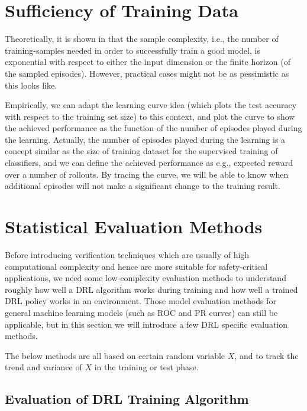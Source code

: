 \section{Sufficiency of Training Data}\label{sec:drlsufficiencytraining}

Theoretically, it is shown in \cite{DBLP:conf/alt/WeiszAS21} that the sample complexity, i.e., the number of  training-samples needed in order to successfully train a good model, is exponential with respect to either the input dimension or the finite horizon (of the sampled episodes). However, practical cases might not be as pessimistic as this looks like. 


Empirically, we can adapt the learning curve idea (which plots the test accuracy with respect to the training set size) to this context, and plot the curve to show the achieved performance as the function of the number of episodes played during the learning. Actually, the number of episodes played during the learning is a concept similar as the size of training dataset for the supervised training of classifiers, and we can define the achieved performance as e.g., expected reward over a number of rollouts. By tracing the curve, we will be able to know when additional episodes will not make a significant change to the training result. 


\section{Statistical Evaluation Methods}\label{sec:DRLevaluation}

Before introducing verification techniques which are usually of high computational complexity and hence are more suitable for safety-critical applications, we need some low-complexity evaluation methods to understand roughly how well a DRL algorithm works during training  and how well a trained DRL policy works in an environment. Those model evaluation methods for general machine learning models (such as ROC and PR curves) can still be applicable, but in this section we will introduce a few DRL specific evaluation methods. 



The below methods are all based on certain random variable $X$, and to track the trend and variance of $X$ in the training or test phase. 


\subsection*{Evaluation of DRL Training Algorithm}



